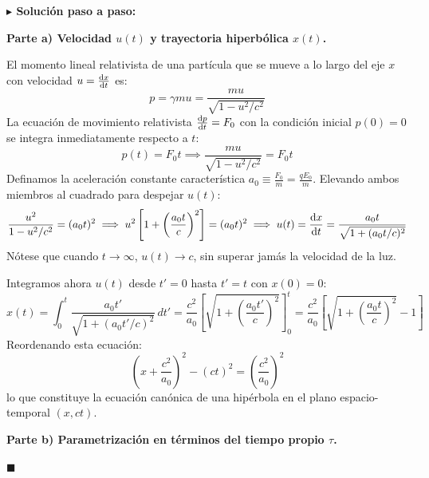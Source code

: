 \documentclass[11pt,a4paper]{book}
\newenvironment{solucion}{%
    \par\medskip\noindent\textbf{\color{blue!65!black}\Large $\blacktriangleright$ Solución paso a paso:}\par\medskip
}{%
    \hfill$\blacksquare$\par\bigskip
}
\begin{document}
\begin{solucion}
\textbf{Parte a) Velocidad $u(t)$ y trayectoria hiperbólica $x(t)$.}

El momento lineal relativista de una partícula que se mueve a lo largo del eje $x$ con velocidad $u = \dv{x}{t}$ es:
\begin{equation}
    p = \gamma m u = \frac{m u}{\sqrt{1 - u^2/c^2}}
\end{equation}
La ecuación de movimiento relativista $\dv{p}{t} = F_0$ con la condición inicial $p(0) = 0$ se integra inmediatamente respecto a $t$:
\begin{equation}
    p(t) = F_0 t \implies \frac{m u}{\sqrt{1 - u^2/c^2}} = F_0 t
\end{equation}
Definamos la aceleración constante característica $a_0 \equiv \frac{F_0}{m} = \frac{q E_0}{m}$. Elevando ambos miembros al cuadrado para despejar $u(t)$:
\begin{equation}
    \frac{u^2}{1 - u^2/c^2} = (a_0 t)^2 \implies u^2 \left[ 1 + \left(\frac{a_0 t}{c}\right)^2 \right] = (a_0 t)^2 \implies u(t) = \dv{x}{t} = \frac{a_0 t}{\sqrt{1 + (a_0 t / c)^2}}
\end{equation}
Nótese que cuando $t \to \infty$, $u(t) \to c$, sin superar jamás la velocidad de la luz.

Integramos ahora $u(t)$ desde $t' = 0$ hasta $t' = t$ con $x(0) = 0$:
\begin{equation}
    x(t) = \int_{0}^{t} \frac{a_0 t'}{\sqrt{1 + (a_0 t' / c)^2}}\,dt' = \frac{c^2}{a_0} \left[ \sqrt{1 + \left(\frac{a_0 t'}{c}\right)^2} \right]_{0}^{t} = \frac{c^2}{a_0} \left[ \sqrt{1 + \left(\frac{a_0 t}{c}\right)^2} - 1 \right]
\end{equation}
Reordenando esta ecuación:
\begin{equation}
    \left( x + \frac{c^2}{a_0} \right)^2 - (ct)^2 = \left(\frac{c^2}{a_0}\right)^2
\end{equation}
lo que constituye la ecuación canónica de una hipérbola en el plano espacio-temporal $(x, ct)$.

\medskip
\textbf{Parte b) Parametrización en términos del tiempo propio $\tau$.}


\end{solucion}
\end{document}
